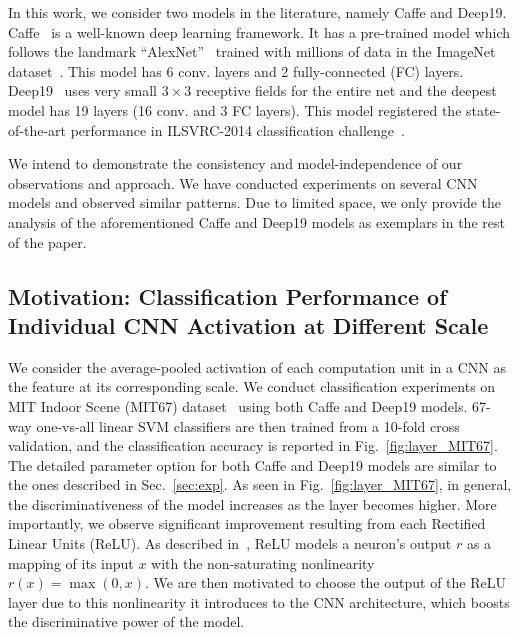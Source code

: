 \documentclass[10pt,twocolumn,letterpaper]{article}
\begin{document}
In this work, we consider two models in the literature, namely Caffe and Deep19. Caffe~\cite{Caffe} is a well-known deep learning framework. It has a pre-trained model which follows the landmark ``AlexNet''~\cite{AlexNet} trained with millions of data in the ImageNet dataset~\cite{ImageNet}. This model has 6 conv. layers and 2 fully-connected (FC) layers. Deep19~\cite{veryDeep} uses very small $3\times 3$ receptive fields for the entire net and the deepest model has 19 layers (16 conv. and 3 FC layers). This model registered the state-of-the-art performance in ILSVRC-2014 classification challenge~\cite{ILSVRC14}. 

We intend to demonstrate the consistency and model-independence of our observations and approach. We have conducted experiments on several CNN models and observed similar patterns. Due to limited space, we only provide the analysis of the aforementioned Caffe and Deep19 models as exemplars in the rest of the paper. 

\subsection{Motivation: Classification Performance of Individual CNN Activation at Different Scale\label{sec:indi_scale}}

We consider the average-pooled activation of each computation unit in a CNN as the feature at its corresponding scale. We conduct classification experiments on MIT Indoor Scene (MIT67) dataset~\cite{MIT67} using both Caffe and Deep19 models. 67-way one-vs-all linear SVM classifiers are then trained from a 10-fold cross validation, and the classification accuracy is reported in Fig.~\ref{fig:layer_MIT67}. The detailed parameter option for both Caffe and Deep19 models are similar to the ones described in Sec.~\ref{sec:exp}. As seen in Fig.~\ref{fig:layer_MIT67}, in general, the discriminativeness of the model increases as the layer becomes higher. More importantly, we observe significant improvement resulting from each Rectified Linear Units (ReLU). As described in~\cite{ReLU,AlexNet}, ReLU models a neuron's output $r$ as a mapping of its input $x$ with the non-saturating nonlinearity $r(x)=\max (0,x)$. We are then motivated to choose the output of the ReLU layer due to this nonlinearity it introduces to the CNN architecture, which boosts the discriminative power of the model. 
\end{document}
